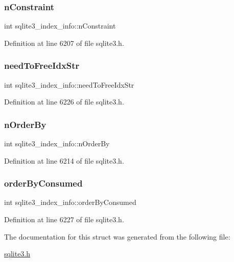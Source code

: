 \subsubsection{\texorpdfstring{n\+Constraint}{nConstraint}}
{\footnotesize\ttfamily int sqlite3\+\_\+index\+\_\+info\+::n\+Constraint}



Definition at line 6207 of file sqlite3.\+h.

\mbox{\label{structsqlite3__index__info_a5410066c067c3891cdf165c70cc4d6b1}} 
\subsubsection{\texorpdfstring{need\+To\+Free\+Idx\+Str}{needToFreeIdxStr}}
{\footnotesize\ttfamily int sqlite3\+\_\+index\+\_\+info\+::need\+To\+Free\+Idx\+Str}



Definition at line 6226 of file sqlite3.\+h.

\mbox{\label{structsqlite3__index__info_a3ef850fdc57eddbc8189fe84d0a9044e}} 
\subsubsection{\texorpdfstring{n\+Order\+By}{nOrderBy}}
{\footnotesize\ttfamily int sqlite3\+\_\+index\+\_\+info\+::n\+Order\+By}



Definition at line 6214 of file sqlite3.\+h.

\mbox{\label{structsqlite3__index__info_a5515d9de0f37f68d7e0930c20a668b29}} 
\subsubsection{\texorpdfstring{order\+By\+Consumed}{orderByConsumed}}
{\footnotesize\ttfamily int sqlite3\+\_\+index\+\_\+info\+::order\+By\+Consumed}



Definition at line 6227 of file sqlite3.\+h.



The documentation for this struct was generated from the following file\+:\begin{DoxyCompactItemize}
\item 
\mbox{\hyperlink{sqlite3_8h}{sqlite3.\+h}}\end{DoxyCompactItemize}
